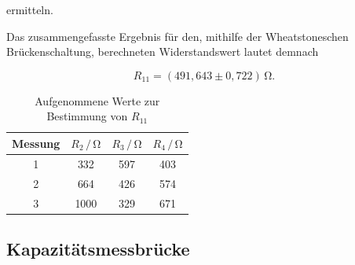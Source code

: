 \noindent 
ermitteln.

\noindent
Das zusammengefasste Ergebnis für den, mithilfe der Wheatstoneschen Brückenschaltung, berechneten Widerstandswert
lautet demnach

\begin{equation}
R_{11} = (491,643 \pm 0,722)\,  \si{\ohm}. \nonumber
\end{equation}
    
\begin{table}[H]
\normalsize

\centering
{}
\begin{tabular}{c c c c}
\toprule
        Messung & $R_{2} \,/\,\si{\ohm}$ & $R_{3} \,/\,\si{\ohm}$ & $R_{4} \,/\,\si{\ohm}$ \\
        \midrule
        1 & 332 & 597 & 403  \\
        2 & 664 & 426 & 574  \\
        3 & 1000 & 329 & 671 \\ 
        
\bottomrule

\end{tabular}

\caption{Aufgenommene Werte zur Bestimmung von $R_{11}$}
\label{tab:1}
\end{table}







\subsection{Kapazitätsmessbrücke}
\label{Kapazitätsmessbrücke}

